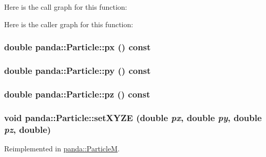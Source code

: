 Here is the call graph for this function:

Here is the caller graph for this function:\hypertarget{classpanda_1_1Particle_a1df59522ef74ec3c533c328aea7f433d}{
\subsubsection[{px}]{\setlength{\rightskip}{0pt plus 5cm}double panda::Particle::px () const}}
\label{classpanda_1_1Particle_a1df59522ef74ec3c533c328aea7f433d}
\hypertarget{classpanda_1_1Particle_a6e8d9ffa8dc261f7b67b6e0c75ba8143}{
\subsubsection[{py}]{\setlength{\rightskip}{0pt plus 5cm}double panda::Particle::py () const}}
\label{classpanda_1_1Particle_a6e8d9ffa8dc261f7b67b6e0c75ba8143}
\hypertarget{classpanda_1_1Particle_adeb8bce6ddfe5429f3db5f0d6ee6e9b0}{
\subsubsection[{pz}]{\setlength{\rightskip}{0pt plus 5cm}double panda::Particle::pz () const}}
\label{classpanda_1_1Particle_adeb8bce6ddfe5429f3db5f0d6ee6e9b0}
\hypertarget{classpanda_1_1Particle_adc7a78ac2476aac1648ae81f70e17211}{
\subsubsection[{setXYZE}]{\setlength{\rightskip}{0pt plus 5cm}void panda::Particle::setXYZE (double {\em px}, \/  double {\em py}, \/  double {\em pz}, \/  double)}}
\label{classpanda_1_1Particle_adc7a78ac2476aac1648ae81f70e17211}


Reimplemented in \hyperlink{classpanda_1_1ParticleM_a725a5be9c884b3819322f1cfd6b83010}{panda::ParticleM}.

